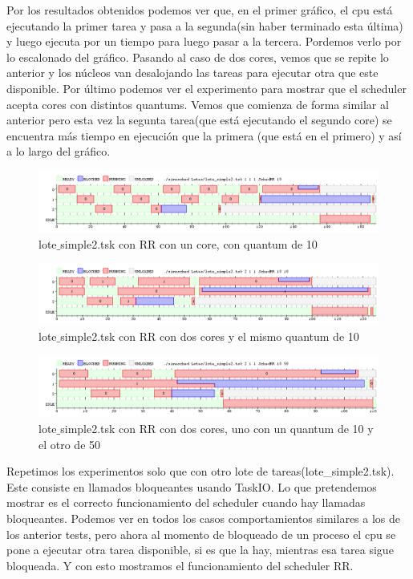 Por los resultados obtenidos podemos ver que, en el primer gráfico, el cpu está ejecutando la primer tarea y pasa a la segunda(sin haber terminado esta última) y luego ejecuta 
por un tiempo para luego pasar a la tercera. Pordemos verlo por lo escalonado del gráfico. Pasando al caso de dos cores, vemos que se repite lo anterior y los núcleos van 
desalojando las tareas para ejecutar otra que este disponible. Por último podemos ver el experimento para mostrar que el scheduler acepta cores con distintos quantums.
Vemos que comienza de forma similar al anterior pero esta vez la segunta tarea(que está ejecutando el segundo core) se encuentra más tiempo en ejecución que la primera
(que está en el primero) y así a lo largo del gráfico.

\begin{figure}[H]
  \centering
    \includegraphics[width=1.1\textwidth]{imagenes/Ej4Experimento4.png}
  \caption{lote$\_$simple2.tsk con RR con un core, con quantum de 10}
\end{figure}

\begin{figure}[H]
  \centering
    \includegraphics[width=1.1\textwidth]{imagenes/Ej4Experimento5.png}
  \caption{lote$\_$simple2.tsk con RR con dos cores y el mismo quantum de 10}
\end{figure}

\begin{figure}[H]
  \centering
    \includegraphics[width=1.1\textwidth]{imagenes/Ej4Experimento6.png}
  \caption{lote$\_$simple2.tsk con RR con dos cores, uno con un quantum de 10 y el otro de 50}
\end{figure}

Repetimos los experimentos solo que con otro lote de tareas(lote_simple2.tsk). Este consiste en llamados bloqueantes usando TaskIO. Lo que pretendemos mostrar es el correcto funcionamiento 
del scheduler cuando hay llamadas bloqueantes. Podemos ver en todos los casos comportamientos similares a los de los anterior tests, pero ahora al momento de bloqueado de 
un proceso el cpu se pone a ejecutar otra tarea disponible, si es que la hay, mientras esa tarea sigue bloqueada. Y con esto mostramos el funcionamiento del scheduler RR.
